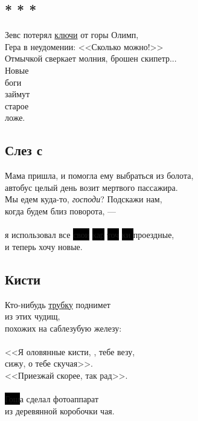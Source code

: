\documentclass[12pt,a5paper]{report}
\newcommand{\hl}[1]{\colorbox{black}{#1}} %
\begin{document}
\subsection[<<Зевс потерял ключи...>>]{* * *}
\label{zevs}
Зевс потерял \hyperref[tuman]{ключи} от горы Олимп,\\
Гера в неудомении: <<Сколько можно!>>\\
Отмычкой сверкает молния, брошен скипетр...\\

Новые\\
\phantom{Новые}боги\\
\phantom{Новые боги}займут\\
старое\\
\phantom{старое}ложе.
\newpage


\subsection{Слез с}

Мама пришла, и помогла ему выбраться из болота,\\
автобус целый день возит мертвого пассажира.\\
Мы едем куда-то, \emph{господи}? Подскажи нам,\\
когда будем близ поворота, ---\\
\\
я использовал все \hl{свои} \hl{кар} \hl{точ} \hl{ки } проездные,\\
и теперь хочу новые.\\
\newpage

\subsection{Кисти}
\label{kisti}

Кто-нибудь \hyperref[rubka]{трубку} поднимет\\
из этих чудищ,\\
похожих на саблезубую железу:\\
\\
<<Я оловянные кисти, \hyperref[himik]{\hl{\phantom{Имя}}}, тебе везу,\\
сижу, о тебе скучая>>.\\
<<Приезжай скорее, так рад>>.\\
\\
\hl{Гош}а сделал фотоаппарат\\
из деревянной коробочки чая.\\
\end{document}
